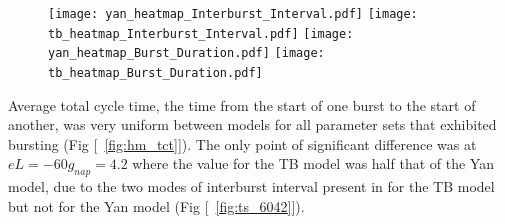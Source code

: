 \documentclass[11pt]{article}
\begin{document}
\begin{figure}[h]
	\centering
	\texttt{[image: yan\_heatmap\_Interburst\_Interval.pdf]}
	\texttt{[image: tb\_heatmap\_Interburst\_Interval.pdf]}
	\texttt{[image: yan\_heatmap\_Burst\_Duration.pdf]}
	\texttt{[image: tb\_heatmap\_Burst\_Duration.pdf]}
\end{figure}

Average total cycle time, the time from the start of one burst to the start of another, was very uniform between models for all parameter sets that exhibited bursting (Fig [~\ref{fig:hm_tct}]). The only point of significant difference was at $eL=-60 g_{nap} = 4.2$ where the value for the TB model was half that of the Yan model, due to the two modes of interburst interval present in for the TB model but not for the Yan model (Fig [~\ref{fig:ts_6042}]).
\end{document}
